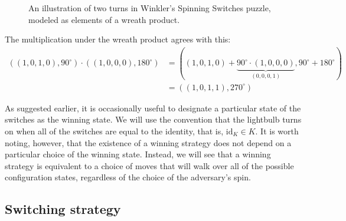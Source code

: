 \begin{example}
\begin{figure}
    \caption[A wreath product interpretation of a spinning switches puzzle.]{
      An illustration of two turns in Winkler's Spinning Switches puzzle,
      modeled as elements of a wreath product.
    }
    \label{fig:WreathProduct}
  \end{figure}

  The multiplication under the wreath product agrees with this: \begin{align*}
    ((1,0,1,0), 90^\circ) \cdot ((1,0,0,0), 180^\circ)
    &= ((1,0,1,0) + \underbrace{90^\circ \cdot (1,0,0,0)}_{(0,0,0,1)}, 90^\circ + 180^\circ) \\
    &= ((1,0,1,1), 270^\circ)
  \end{align*}
\end{example}

As suggested earlier, it is occasionally useful to designate a particular state
of the switches as the winning state. We will use the
convention that the lightbulb turns on when all of the switches are equal to the
identity, that is, $\mathrm{id}_K \in K$.
It is worth noting, however, that the existence of a winning strategy does not
depend on a particular choice of the winning state.
Instead, we will see that a winning strategy is equivalent to a choice of moves
that will walk over all of the possible configuration states, regardless of the
choice of the adversary's spin.

\subsection{Switching strategy}

